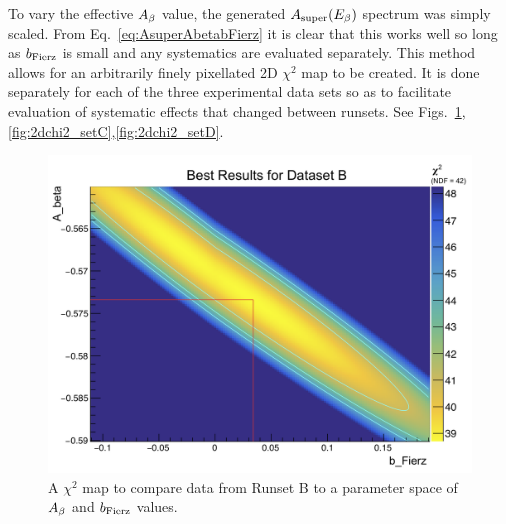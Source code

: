 To vary the effective $A_{\beta}$ value, the generated $A_{\mathrm{super}}(E_{\beta})$ spectrum was simply scaled.  From Eq.~\ref{eq:AsuperAbetabFierz} it is clear that this works well so long as $b_{\mathrm{Fierz}}$ is small and any systematics are evaluated separately.  This method allows for an arbitrarily finely pixellated 2D $\chi^2$ map to be created.  It is done separately for each of the three experimental data sets so as to facilitate evaluation of systematic effects that changed between runsets.  See Figs.~\ref{fig:2dchi2_setB},\ref{fig:2dchi2_setC},\ref{fig:2dchi2_setD}.

\begin{figure}[h!tb]
	\centering
	\includegraphics[width=.999\linewidth]
	{Figures/Chi2_2D_SetB.png}
	\caption[$\chi^2$ Map for Runset B]{A $\chi^2$ map to compare data from Runset B to a parameter space of $A_{\beta}$ and $b_{\mathrm{Fierz}}$ values.}	
	\label{fig:2dchi2_setB}
\end{figure}
%
